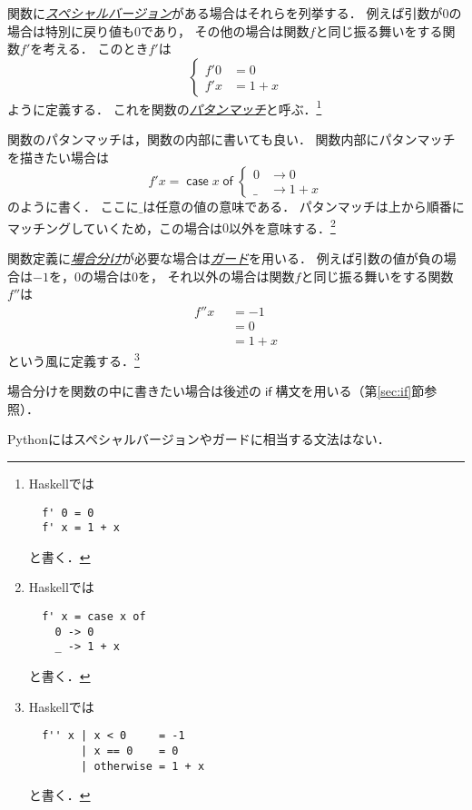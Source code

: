 \documentclass[a5paper,draft]{jsbook}
\newcommand{\programminglanguage}[1]{\textsf{#1}}
\newcommand{\haskell}{\programminglanguage{Haskell}}
\newcommand{\python}{\programminglanguage{Python}}
\newcommand{\keyword}[1]{{\underline{\emph{#1}}}}
\newcommand{\mathGuard}[1]{\mathop{\mid_{#1}}}
\newcommand{\mathKeyword}[1]{\operatorname{\textsf{#1}}}
\newcommand{\mathIf}{\mathKeyword{if}}
\newcommand{\mathOtherwise}{\mathKeyword{otherwise}}
\newcommand{\mathCaseCase}{\mathKeyword{case}}
\newcommand{\mathCaseOf}{\mathKeyword{of}}
\newcommand{\mathCase}[2]{\mathCaseCase#1\mathCaseOf#2}
\begin{document}
関数に\keyword{スペシャルバージョン}がある場合はそれらを列挙する．
例えば引数が$0$の場合は特別に戻り値も$0$であり，
その他の場合は関数$f$と同じ振る舞いをする関数$f'$を考える．
このとき$f'$は
\begin{equation}
\left\{
\begin{split}
f'0&=0\\
f'x&=1+x
\end{split}
\right.
\end{equation}
ように定義する．
これを関数の\keyword{パタンマッチ}と呼ぶ．\footnote{\haskell では
\begin{verbatim}
  f' 0 = 0
  f' x = 1 + x
\end{verbatim}
と書く．}

関数のパタンマッチは，関数の内部に書いても良い．
関数内部にパタンマッチを描きたい場合は
\begin{equation}
f'x=\mathCase{x}{\left\{
\begin{split}
0&\rightarrow0\\
\_&\rightarrow1+x
\end{split}
\right.}
\end{equation}
のように書く．
ここに$\_$は任意の値の意味である．
パタンマッチは上から順番にマッチングしていくため，この場合は$0$以外を意味する．\footnote{\haskell では
\begin{verbatim}
  f' x = case x of
    0 -> 0
    _ -> 1 + x
\end{verbatim}
と書く．}

関数定義に\keyword{場合分け}が必要な場合は\keyword{ガード}を用いる．
例えば引数の値が負の場合は$-1$を，$0$の場合は$0$を，
それ以外の場合は関数$f$と同じ振る舞いをする関数$f''$は
\begin{equation}
\begin{split}
f''x&\mathGuard{x<0}=-1\\
&\mathGuard{x\equiv 0}=0\\
&\mathGuard{\mathOtherwise}=1+x
\end{split}
\end{equation}
という風に定義する．\footnote{\haskell では
\begin{verbatim}
  f'' x | x < 0     = -1
        | x == 0    = 0
        | otherwise = 1 + x
\end{verbatim}
と書く．}

場合分けを関数の中に書きたい場合は後述の$\mathIf$構文を用いる（第\ref{sec:if}節参照）．

\python にはスペシャルバージョンやガードに相当する文法はない．
\end{document}
